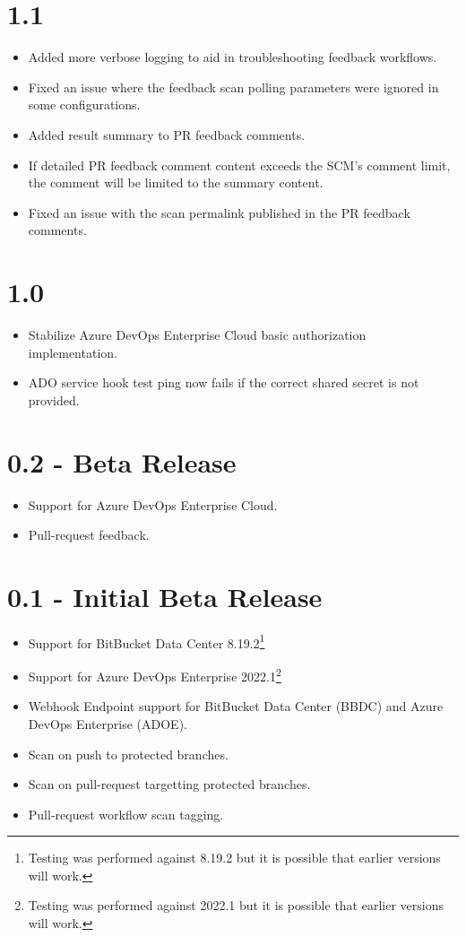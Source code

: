 \section{1.1}

\begin{itemize}
    \item Added more verbose logging to aid in troubleshooting feedback workflows.
    \item Fixed an issue where the feedback scan polling parameters were ignored in some configurations.
    \item Added result summary to PR feedback comments.
    \item If detailed PR feedback comment content exceeds the SCM's comment limit, the comment will be limited to the summary content.
    \item Fixed an issue with the scan permalink published in the PR feedback comments.
\end{itemize}


\section{1.0}

\begin{itemize}
    \item Stabilize Azure DevOps Enterprise Cloud basic authorization implementation.
    \item ADO service hook test ping now fails if the correct shared secret is not provided.
\end{itemize}


\section{0.2 - Beta Release}
   

\begin{itemize}
    \item Support for Azure DevOps Enterprise Cloud.
    \item Pull-request feedback.
\end{itemize}

\section{0.1 - Initial Beta Release}
   

\begin{itemize}
    \item Support for BitBucket Data Center 8.19.2\footnote{Testing was performed against 8.19.2 but it is possible that earlier versions will work.}
    \item Support for Azure DevOps Enterprise 2022.1\footnote{Testing was performed against 2022.1 but it is possible that earlier versions will work.}
    \item Webhook Endpoint support for BitBucket Data Center (BBDC) and Azure DevOps Enterprise (ADOE).
    \item Scan on push to protected branches.
    \item Scan on pull-request targetting protected branches.
    \item Pull-request workflow scan tagging.
\end{itemize}